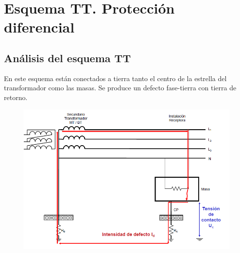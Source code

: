 \chapter{Esquema TT. Protección diferencial}
\section{Análisis del esquema TT}
En este esquema están conectados a tierra tanto el centro de la estrella del transformador como las masas. Se produce un defecto fase-tierra con tierra de retorno.
\begin{figure}[H]
	\centering
	\includegraphics[width=0.5\linewidth]{Images/26}
	\label{fig:26}
\end{figure}


